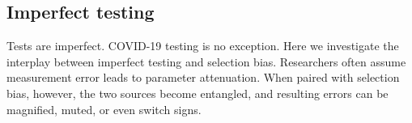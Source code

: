 \documentclass[11pt]{amsart}
\numberwithin{equation}{section}
\theoremstyle{plain}
\def\I{\bf I}
\begin{document}

 \subsection{Imperfect testing}
 \label{section:imperfecttesting}

 Tests are imperfect.  COVID-19 testing is no exception. Here we investigate the interplay between imperfect testing and selection bias.  Researchers often assume measurement error leads to parameter attenuation.  When paired with selection bias, however, the two sources become entangled, and resulting errors can be magnified, muted, or even switch signs.
\end{document}
